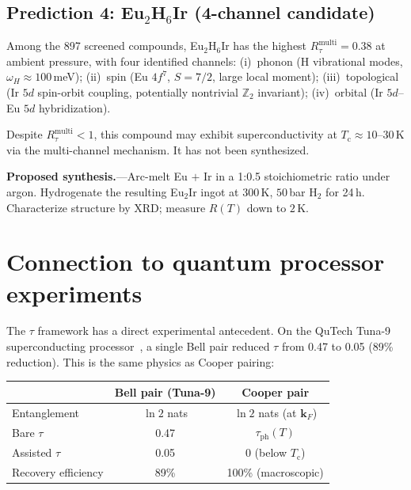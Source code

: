 \documentclass[prb,twocolumn,superscriptaddress,longbibliography,floatfix]{revtex4-2}
\newcommand{\tauasym}{\tau}
\newcommand{\taudec}{\tauasym_{\mathrm{ph}}}
\newcommand{\Rtau}{R_{\tauasym}}
\newcommand{\Tc}{T_{\mathrm{c}}}
\begin{document}
\subsection{Prediction 4: Eu$_2$H$_6$Ir
(4-channel candidate)}

Among the 897 screened compounds, Eu$_2$H$_6$Ir has the
highest $\Rtau^{\mathrm{multi}} = 0.38$ at ambient pressure,
with four identified channels:
(i)~phonon (H vibrational modes, $\omega_H \approx 100\,$meV);
(ii)~spin (Eu $4f^7$, $S = 7/2$, large local moment);
(iii)~topological (Ir $5d$ spin-orbit coupling,
potentially nontrivial $\mathbb{Z}_2$ invariant);
(iv)~orbital (Ir $5d$--Eu $5d$ hybridization).

Despite $\Rtau^{\mathrm{multi}} < 1$, this compound may
exhibit superconductivity at $\Tc \approx 10$--$30\,$K
via the multi-channel mechanism.  It has not been synthesized.

\textbf{Proposed synthesis.}---Arc-melt Eu $+$ Ir in a
1:0.5 stoichiometric ratio under argon.  Hydrogenate the
resulting Eu$_2$Ir ingot at $300\,$K, $50\,$bar H$_2$
for 24\,h.  Characterize structure by XRD; measure $R(T)$
down to $2\,$K.

\section{Connection to quantum processor experiments}
\label{sec:tuna9}

The $\tauasym$ framework has a direct experimental antecedent.
On the QuTech Tuna-9 superconducting processor~\cite{Huang2026exp},
a single Bell pair reduced $\tauasym$ from 0.47 to 0.05 (89\%
reduction).  This is the same physics as Cooper pairing:

\begin{center}
\begin{tabular}{lcc}
\toprule
& Bell pair (Tuna-9) & Cooper pair \\
\midrule
Entanglement & $\ln 2$ nats & $\ln 2$ nats (at $\bm{k}_F$) \\
Bare $\tauasym$ & 0.47 & $\taudec(T)$ \\
Assisted $\tauasym$ & 0.05 & 0 (below $\Tc$) \\
Recovery efficiency & 89\% & 100\% (macroscopic) \\
\bottomrule
\end{tabular}
\end{center}
\end{document}
